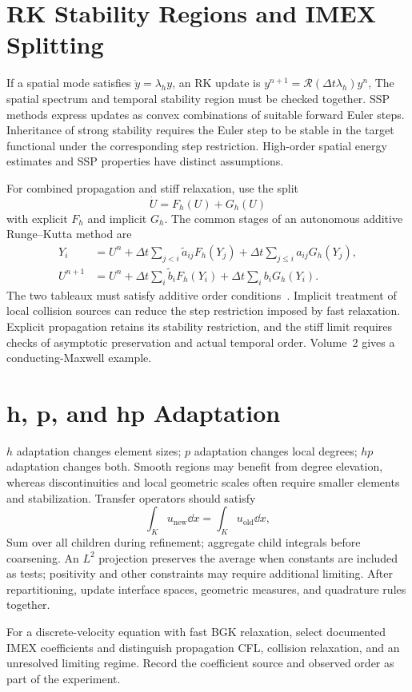 \section{RK Stability Regions and IMEX Splitting}
If a spatial mode satisfies $\dot y=\lambda_hy$, an RK update is
$y^{n+1}=\mathcal R(\Delta t\lambda_h)y^n$,
The spatial spectrum and temporal stability region must be checked together.
SSP methods express updates as convex combinations of suitable forward Euler steps.
Inheritance of strong stability requires the Euler step to be stable in the target functional under the corresponding step restriction.
High-order spatial energy estimates and SSP properties have distinct assumptions.

For combined propagation and stiff relaxation, use the split
\[
\dot U=F_h(U)+G_h(U)
\]
with explicit $F_h$ and implicit $G_h$.
The common stages of an autonomous additive Runge--Kutta method are
\[
\begin{aligned}
Y_i&=U^n+\Delta t\sum_{j<i}\widetilde a_{ij}F_h(Y_j)
+\Delta t\sum_{j\le i}a_{ij}G_h(Y_j),\\
U^{n+1}&=U^n+\Delta t\sum_i\widetilde b_iF_h(Y_i)
+\Delta t\sum_i b_iG_h(Y_i).
\end{aligned}
\]
The two tableaux must satisfy additive order conditions~\cite{ascher1997}.
Implicit treatment of local collision sources can reduce the step restriction imposed by fast relaxation.
Explicit propagation retains its stability restriction, and the stiff limit requires checks of asymptotic preservation and actual temporal order.
Volume~2 gives a conducting-Maxwell example.

\section{h, p, and hp Adaptation}
$h$ adaptation changes element sizes; $p$ adaptation changes local degrees; $hp$ adaptation changes both.
Smooth regions may benefit from degree elevation, whereas discontinuities and local geometric scales often require smaller elements and stabilization.
Transfer operators should satisfy
\[
\int_Ku_{\mathrm{new}}\dd x
=\int_Ku_{\mathrm{old}}\dd x,
\]
Sum over all children during refinement; aggregate child integrals before coarsening.
An $L^2$ projection preserves the average when constants are included as tests; positivity and other constraints may require additional limiting.
After repartitioning, update interface spaces, geometric measures, and quadrature rules together.

{For a discrete-velocity equation with fast BGK relaxation, select documented IMEX coefficients and distinguish propagation CFL, collision relaxation, and an unresolved limiting regime. Record the coefficient source and observed order as part of the experiment.}
